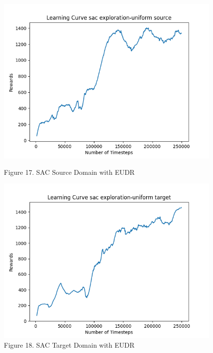\documentclass[12pt]{article}
\begin{document}
\begin{figure}[H]
    \centering
    \begin{minipage}{0.45\textwidth}
        \centering
        \includegraphics[width=\textwidth]{../images/Learning_Curve_SAC_EU_Source.png}
        \caption{Figure 17. SAC Source Domain with EUDR}
        \label{fig:sac_source_eudr}
    \end{minipage}
    \hfill
    \begin{minipage}{0.45\textwidth}
        \centering
        \includegraphics[width=\textwidth]{../images/Learning_Curve_SAC_EU_Target.png}
        \caption{Figure 18. SAC Target Domain with EUDR}
        \label{fig:sac_target_eudr}
    \end{minipage}

\end{figure}
\end{document}
